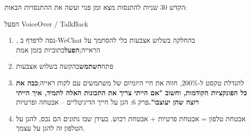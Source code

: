 \begin{tcbinfo}{הקדש 30 שניות להתנסות}
מצא זמן פנוי ועשה את ההתנסויות הבאות:

\end{tcbinfo}

\begin{tcbpractice}{הפעל}
VoiceOver / TalkBack

\begin{enumerate}
  \item , נסה לדפדף ב-WeChat בהחלקה בשלוש אצבעות בלי להסתמך על הראייה;\textbf{הפעל}כתוביות בזמן אמת
  \item פתח\textbf{השתמש}בהקשה בשלוש אצבעות
  \item להגדלת טקסט ל-200\%, חווה את חיי היומיום של משתמשים עם לקות ראייה;\textbf{כבה את כל הפונקציות הקודמות, וחשוב "אם הייתי צריך את התכונות האלה לתמיד, איך הייתי רוצה שהן יעוצבו".}פרק 6: הגן על חייך הדיגיטליים – אבטחה ופרטיות
  \item אבטחת טלפון = אבטחת פרטיות + אבטחת רכוש. בעידן שבו נתונים הם נכס, להגן על הטלפון זה להגן על עצמך.
\end{enumerate}

\end{tcbpractice}
